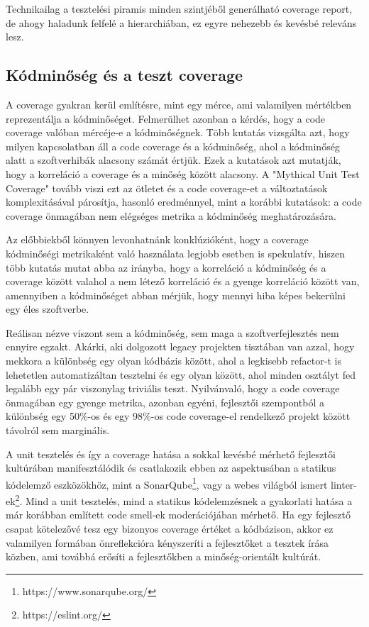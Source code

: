 Technikailag a tesztelési piramis minden szintjéből generálható coverage report, de ahogy haladunk felfelé a hierarchiában, ez egyre nehezebb és kevésbé releváns lesz.

\subsection{Kódminőség és a teszt coverage}

A coverage gyakran kerül említésre, mint egy mérce, ami valamilyen mértékben reprezentálja a kódminőséget. Felmerülhet azonban a kérdés, hogy a code coverage valóban mércéje-e a kódminőségnek. Több kutatás \cite{onRelation}\cite{singhkochhar:hal-01653728} vizsgálta azt, hogy milyen kapcsolatban áll a code coverage és a kódminőség, ahol a kódminőség alatt a szoftverhibák alacsony számát értjük. Ezek a kutatások azt mutatják, hogy a korreláció a coverage és a minőség között alacsony. A "Mythical Unit Test Coverage"\cite{mythical} tovább viszi ezt az ötletet és a code coverage-et a változtatások komplexitásával párosítja, hasonló eredménnyel, mint a korábbi kutatások: a code coverage önmagában nem elégséges metrika a kódminőség meghatározására.

Az előbbiekből könnyen levonhatnánk konklúzióként, hogy a coverage kódminőségi metrikaként való használata legjobb esetben is spekulatív, hiszen több kutatás mutat abba az irányba, hogy a korreláció a kódminőség és a coverage között valahol a nem létező korreláció és a gyenge korreláció között van, amennyiben a kódminőséget abban mérjük, hogy mennyi hiba képes bekerülni egy éles szoftverbe.

Reálisan nézve viszont sem a kódminőség, sem maga a szoftverfejlesztés nem ennyire egzakt. Akárki, aki dolgozott legacy projekten tisztában van azzal, hogy mekkora a különbség egy olyan kódbázis között, ahol a legkisebb refactor-t is lehetetlen automatizáltan tesztelni és egy olyan között, ahol minden osztályt fed legalább egy pár viszonylag triviális teszt. Nyilvánvaló, hogy a code coverage önmagában egy gyenge metrika, azonban egyéni, fejlesztői szempontból a különbség egy 50\%-os és egy 98\%-os code coverage-el rendelkező projekt között távolról sem marginális.

A unit tesztelés és így a coverage hatása a sokkal kevésbé mérhető fejlesztői kultúrában manifesztálódik és csatlakozik ebben az aspektusában a statikus kódelemző eszközökhöz, mint a SonarQube\footnote{https://www.sonarqube.org/}, vagy a webes világból ismert linter-ek\footnote{https://eslint.org/}. Mind a unit tesztelés, mind a statikus kódelemzésnek a gyakorlati hatása a már korábban említett code smell-ek moderációjában mérhető. Ha egy fejlesztő csapat kötelezővé tesz egy bizonyos coverage értéket a kódbázison, akkor ez valamilyen formában önreflekcióra kényszeríti a fejlesztőket a tesztek írása közben, ami továbbá erősíti a fejlesztőkben a minőség-orientált kultúrát.

